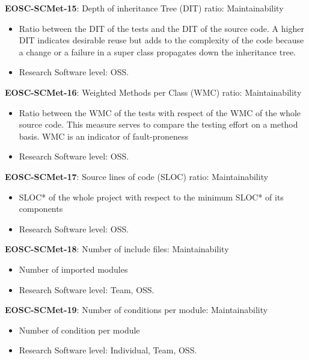 \textbf{EOSC-SCMet-15}: Depth of inheritance Tree (DIT) ratio: Maintainability

\begin{itemize}
    \item Ratio between the DIT of the tests and the DIT of the source code. A higher DIT indicates desirable reuse but adds to the
complexity of the code because a change or a failure in a super class propagates down the inheritance tree. \cite{nagappan_early_2005}
    \item Research Software level: OSS.
\end{itemize}

\textbf{EOSC-SCMet-16}: Weighted Methods per Class (WMC) ratio: Maintainability

\begin{itemize}
    \item Ratio between the WMC of the tests with respect of the WMC of the whole source code. This measure serves to compare the testing effort on a method basis. WMC is an indicator of fault-proneness \cite{nagappan_early_2005}
    \item Research Software level: OSS.
\end{itemize}

\textbf{EOSC-SCMet-17}: Source lines of code (SLOC) ratio: Maintainability

\begin{itemize}
    \item SLOC* of the whole project with respect to the minimum SLOC* of its components \cite{nagappan_early_2005}
    \item Research Software level: OSS.
\end{itemize}

\textbf{EOSC-SCMet-18}: Number of include files: Maintainability

\begin{itemize}
    \item Number of imported modules \cite{ogasawara_experiences_1996}
    \item Research Software level: Team, OSS.
\end{itemize}

\textbf{EOSC-SCMet-19}: Number of conditions per module: Maintainability

\begin{itemize}
    \item Number of condition per module \cite{ogasawara_experiences_1996}
    \item Research Software level: Individual, Team, OSS.
\end{itemize}

